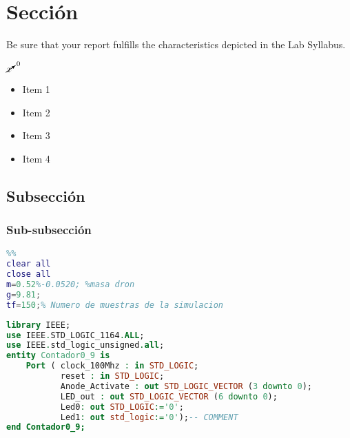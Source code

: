 \documentclass[12pt]{article}  %
\begin{document}
\section{Sección}
Be sure that your report fulfills the characteristics depicted in the Lab Syllabus.

$\cancelto{0}{x}$ %
\begin{itemize}
    \item Item 1
    \item Item 2
    \item Item 3
    \item Item 4
\end{itemize}


\subsection{Subsección}
\cite{Agarwal2019} \cite{gh1562} %

\subsubsection{Sub-subsección}

\begin{lstlisting}[language=Matlab, caption=Código de matlab]
  %init_quad_reconfig_add.m %Ejecutar el programa de inicializacion
%%
clear all
close all
m=0.52%-0.0520; %masa dron
g=9.81;
tf=150;% Numero de muestras de la simulacion

\end{lstlisting}




\begin{lstlisting}[language=VHDL, caption=Código en VHDL]
  library IEEE;
use IEEE.STD_LOGIC_1164.ALL;
use IEEE.std_logic_unsigned.all;
entity Contador0_9 is
    Port ( clock_100Mhz : in STD_LOGIC;
           reset : in STD_LOGIC;
           Anode_Activate : out STD_LOGIC_VECTOR (3 downto 0);
           LED_out : out STD_LOGIC_VECTOR (6 downto 0);
           Led0: out STD_LOGIC:='0';
           Led1: out std_logic:='0');-- COMMENT
end Contador0_9;
\end{lstlisting}
\end{document}
